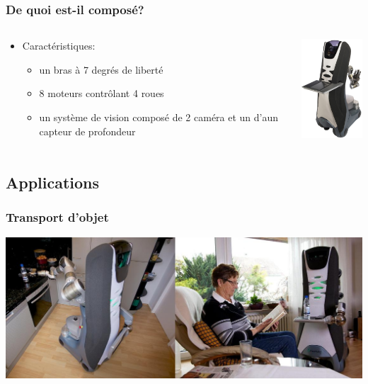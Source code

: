 \begin{frame}
	\frametitle{De quoi est-il composé?}
	\begin{columns}[T]
		\begin{column}{.5\textwidth}
			\begin{itemize}
			\item Caractéristiques:
				\begin{itemize}
				\item un bras à 7 degrés de liberté
				\item 8 moteurs contrôlant 4 roues
				\item un système de vision composé de
                                  2 caméra et un d'aun capteur de
                                  profondeur
				\end{itemize}
			\end{itemize}
		\end{column}
   		\begin{column}{.5\textwidth}
			\includegraphics[width=3cm]{./image/Care_o_bot_3.jpg}
   		\end{column}
	\end{columns}
\end{frame}

\subsection{Applications}
\begin{frame}
	\frametitle{Transport d'objet}
	\begin{center}
	\includegraphics[scale = 0.36]{./image/Fetch_and_Carry2.JPG}
	\end{center}
\end{frame}

